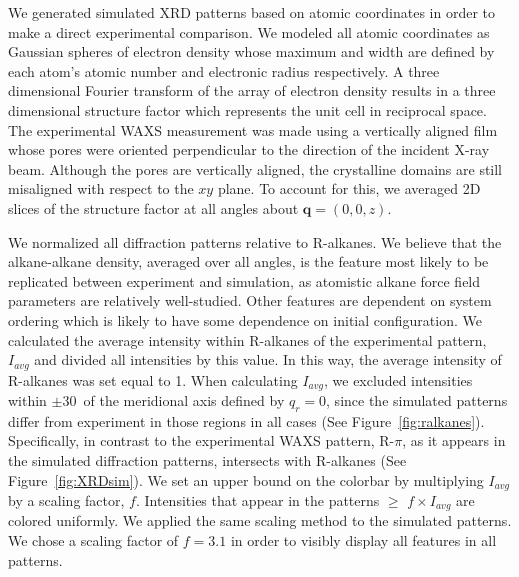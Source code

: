 \documentclass[journal=jpcbfk,manuscript=article]{achemso}
\begin{document}
  We generated simulated XRD patterns based on atomic coordinates in order to
  make a direct experimental comparison. We modeled all atomic coordinates as
  Gaussian spheres of electron density whose maximum and width are defined by
  each atom's atomic number and electronic radius respectively. A three dimensional
  Fourier transform of the array of electron density results in a three
  dimensional structure factor which represents the unit cell in reciprocal
  space. The experimental WAXS measurement was made using a vertically aligned
  film whose pores were oriented perpendicular to the direction of the incident
  X-ray beam. 
  Although the pores are vertically aligned, the crystalline domains are
  still misaligned with respect to the $xy$ plane. To account for this, we averaged
  2D slices of the structure factor at all angles about $\mathbf{q} = (0, 0, z)$. 

  We normalized all diffraction patterns relative to R-alkanes. We believe that
  the alkane-alkane density, averaged over all angles, is the feature most likely
  to be replicated between experiment and simulation, as atomistic alkane
  force field parameters are relatively well-studied. Other features are dependent on system
  ordering which is likely to have some dependence on initial configuration.  We
  calculated the average intensity within R-alkanes of the experimental pattern,
  $I_{avg}$ and divided all intensities by this value. In this way, the average
  intensity of R-alkanes was set equal to 1. When calculating $I_{avg}$, we excluded
  intensities within $\pm$30\degree~of the meridional axis defined by $q_r=0$,
  since the simulated patterns differ from experiment in those regions in all
  cases (See Figure~\ref{fig:ralkanes}). Specifically, in contrast to the
  experimental WAXS pattern, R-$\pi$, as it appears in the simulated diffraction
  patterns, intersects with R-alkanes (See Figure~\ref{fig:XRDsim}). We set an
  upper bound on the colorbar by multiplying $I_{avg}$ by a scaling factor, $f$.
  Intensities that appear in the patterns $\geq$ $f\times I_{avg}$ are colored
  uniformly.  We applied the same scaling method to the simulated patterns. We
  chose a scaling factor of $f=3.1$ in order to visibly display all
  features in all patterns.

\end{document}
